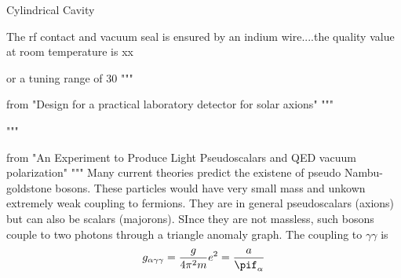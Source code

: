 \documentclass[11pt]{book}
\begin{document}
Cylindrical Cavity

The rf contact and vacuum seal is ensured by an indium wire....the quality value at room temperature is xx%

or a tuning range of 30%
"""

from "Design for a practical laboratory detector for solar axions"
"""

"""

from "An Experiment to Produce Light Pseudoscalars and QED vacuum polarization"
"""
Many current theories predict the existene of pseudo Nambu-goldstone bosons. These particles would have very small mass and unkown extremely weak coupling to fermions. They are in general pseudoscalars (axions) but can also be scalars (majorons). SInce they are not massless, such bosons couple to two photons through a triangle anomaly graph. The coupling to $\gamma\gamma$ is
\[

g_{\alpha\gamma\gamma} = \frac{g}{4\pi^2 m}e^2 = \frac{a}{\pif_\alpha}

\]
\end{document}
